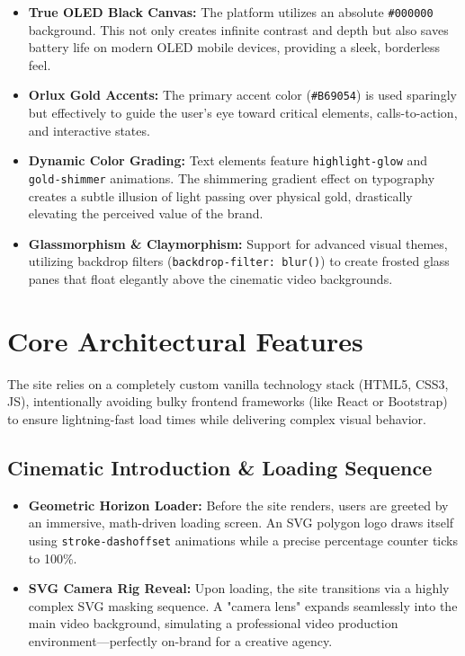 \documentclass[11pt, a4paper]{article}
\begin{document}
\begin{itemize}[label=\textcolor{orluxgold}{\textbullet}]
    \item \textbf{True OLED Black Canvas:} The platform utilizes an absolute \texttt{\#000000} background. This not only creates infinite contrast and depth but also saves battery life on modern OLED mobile devices, providing a sleek, borderless feel.
    \item \textbf{Orlux Gold Accents:} The primary accent color (\texttt{\#B69054}) is used sparingly but effectively to guide the user's eye toward critical elements, calls-to-action, and interactive states.
    \item \textbf{Dynamic Color Grading:} Text elements feature \texttt{highlight-glow} and \texttt{gold-shimmer} animations. The shimmering gradient effect on typography creates a subtle illusion of light passing over physical gold, drastically elevating the perceived value of the brand.
    \item \textbf{Glassmorphism \& Claymorphism:} Support for advanced visual themes, utilizing backdrop filters (\texttt{backdrop-filter: blur()}) to create frosted glass panes that float elegantly above the cinematic video backgrounds.
\end{itemize}

\section{Core Architectural Features}
The site relies on a completely custom vanilla technology stack (HTML5, CSS3, JS), intentionally avoiding bulky frontend frameworks (like React or Bootstrap) to ensure lightning-fast load times while delivering complex visual behavior.

\subsection{Cinematic Introduction \& Loading Sequence}
\begin{itemize}[label=\textcolor{orluxgold}{\textbullet}]
    \item \textbf{Geometric Horizon Loader:} Before the site renders, users are greeted by an immersive, math-driven loading screen. An SVG polygon logo draws itself using \texttt{stroke-dashoffset} animations while a precise percentage counter ticks to 100\%.
    \item \textbf{SVG Camera Rig Reveal:} Upon loading, the site transitions via a highly complex SVG masking sequence. A "camera lens" expands seamlessly into the main video background, simulating a professional video production environment—perfectly on-brand for a creative agency.
\end{itemize}
\end{document}
